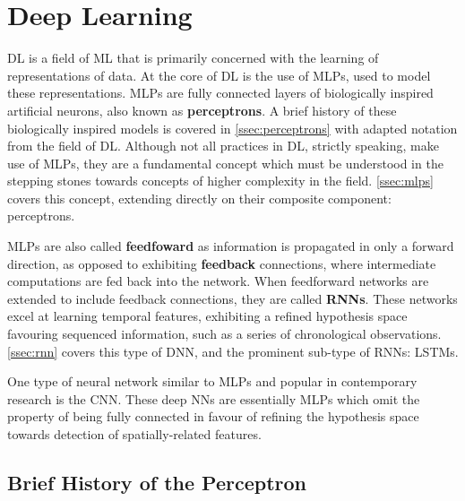 \section{Deep Learning\label{sec:DL}}
\Gls{DL} is a field of \gls{ML} that is primarily concerned with the learning of
representations of data. At the core of \gls{DL} is the use of \glspl{MLP}, used
to model these representations. \Glspl{MLP} are fully connected layers of
biologically inspired artificial neurons, also known as \textbf{perceptrons}. A
brief history of these biologically inspired models is covered in
\autoref{ssec:perceptrons} with adapted notation from the field of \gls{DL}.
Although not all practices in \gls{DL}, strictly speaking, make use of
\glspl{MLP}, they are a fundamental concept which must be understood in the
stepping stones towards concepts of higher complexity in the field.
\autoref{ssec:mlps} covers this concept, extending directly on their composite
component: perceptrons.

\Glspl{MLP} are also called \textbf{feedfoward} as information is propagated in
only a forward direction, as opposed to exhibiting \textbf{feedback} connections,
where intermediate computations are fed back into the network. When feedforward
networks are extended to include feedback connections, they are called
\textbf{\glspl{RNN}}. These networks excel at learning temporal
features, exhibiting a refined hypothesis space favouring sequenced information,
such as a series of chronological observations. \autoref{ssec:rnn} covers this
type of \gls{DNN}, and the prominent sub-type of \glspl{RNN}: \glspl{LSTM}.

One type of neural network similar to \glspl{MLP} and popular in
contemporary research is the \gls{CNN}. These deep \glspl{NN} are essentially
\glspl{MLP} which omit the property of being fully connected in favour of
refining the hypothesis space towards detection of spatially-related features.


\subsection{Brief History of the Perceptron\label{ssec:perceptrons}}


